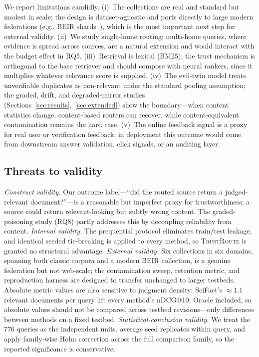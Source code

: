 \documentclass[preprint,12pt]{elsarticle}
\newcommand{\system}{\textsc{TrustRoute}}
\begin{document}
We report limitations candidly. (i)~The collections are real and standard but
modest in scale; the design is dataset-agnostic and ports directly to large
modern federations (e.g., BEIR shards~\cite{thakur2021beir}), which is the most
important next step for external validity. (ii)~We study single-home routing;
multi-home queries, where evidence is spread across sources, are a natural
extension and would interact with the budget effect in RQ5. (iii)~Retrieval is
lexical (BM25); the trust mechanism is orthogonal to the base retriever and should
compose with neural rankers, since it multiplies whatever relevance score is
supplied. (iv)~The evil-twin model treats unverifiable duplicates as non-relevant
under the standard pooling assumption; the graded, drift, and degraded-mirror
studies (Sections~\ref{sec:results},~\ref{sec:extended}) show the boundary---when
content statistics change, content-based routers can recover, while
content-equivalent contamination remains the hard case. (v)~The online feedback
signal is a proxy for real user or verification feedback; in deployment this
outcome would come from downstream answer validation, click signals, or an
auditing layer.

\subsection{Threats to validity}
\emph{Construct validity.} Our outcome label---``did the routed source return a
judged-relevant document?''---is a reasonable but imperfect proxy for
trustworthiness; a source could return relevant-looking but subtly wrong content.
The graded-poisoning study (RQ8) partly addresses this by decoupling reliability
from content. \emph{Internal validity.} The prequential protocol eliminates
train/test leakage, and identical seeded tie-breaking is applied to every method,
so \system{} is granted no structural advantage. \emph{External validity.} Six
collections in six domains, spanning both classic corpora and a modern BEIR
collection, is a genuine federation but not web-scale; the contamination sweep,
retention metric, and reproduction harness are designed to transfer unchanged to
larger testbeds. Absolute metric values are also sensitive to judgment density:
SciFact's $\approx1.1$ relevant documents per query lift every method's nDCG@10,
Oracle included, so absolute values should not be compared across testbed
revisions---only differences between methods on a fixed testbed. \emph{Statistical-conclusion validity.}
We treat the 776 queries as the independent units, average seed replicates within
query, and apply family-wise Holm correction across the full comparison family,
so the reported significance is conservative.
\end{document}

